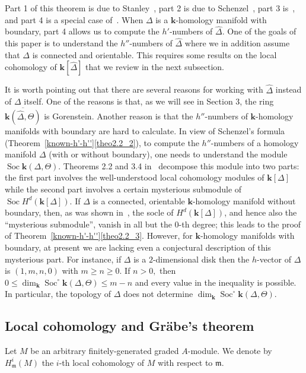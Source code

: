 \documentclass[ALCO,ThmDefs,Unicode,epreuves]{cedram}
\DeclareMathOperator{\Soc}{Soc}
\newcommand{\complet}[1]{\hat{#1}}
\newcommand{\field}{\mathbf{k}}
\newcommand{\mideal}{\ensuremath{\mathfrak{m}}}
\begin{document}
\noindent Part 1 of this theorem is due to Stanley~\cite{Stanley-75}, part 2 is due to Schenzel~\cite{Schenzel-81}, part 3 is~\cite[Theorem~1.3]{Novik-Swartz-09:Gorenstein}, and part 4 is a special case of~\cite[Theorem~4.7]{Novik-Swartz-12}. When $\Delta$ is a $\field$-homology manifold with boundary, part 4 allows us to compute the $h'$-numbers of $\complet{\Delta}$. One of the goals of this paper is to understand the $h''$-numbers of $\complet{\Delta}$ where we in addition assume that $\Delta$ is connected and orientable. This requires some results on the local cohomology of $\field[\complet{\Delta}]$ that we review in the next subsection.


 It is worth pointing out that there are several reasons for working with $\complet{\Delta}$ instead of $\Delta$ itself. One of the reasons is that, as we will see in Section 3, the ring $\overline{\field(\complet{\Delta},\Theta)}$ is Gorenstein. Another reason is that the $h''$-numbers of $\field$-homology manifolds with boundary are hard to calculate. In view of Schenzel's formula (Theorem~\ref{known-h'-h''}\eqref{theo2.2_2}), to compute the $h''$-numbers of a homology manifold $\Delta$ (with or without boundary), one needs to understand the module $\Soc \field(\Delta,\Theta)$. Theorems 2.2 and 3.4 in~\cite{Novik-Swartz-09:Socles} decompose this module into two parts: the first part involves the well-understood local cohomology modules of $\field[\Delta]$ while the second part involves a certain mysterious submodule of $\Soc H^d(\field[\Delta])$. If $\Delta$ is a connected, orientable $\field$-homology manifold without boundary, then, as was shown in~\cite[Theorem~2.1]{Novik-Swartz-09:Gorenstein}, the socle of $H^d(\field[\Delta])$, and hence also the ``mysterious submodule'', vanish in all but the $0$-th degree; this leads to the proof of Theorem~\ref{known-h'-h''}\eqref{theo2.2_3}. However, for $\field$-homology manifolds with boundary, at present we are lacking even a conjectural description of this mysterious part. For instance, if $\Delta$ is a $2$-dimensional disk then the $h$-vector of $\Delta$ is $(1,m,n,0)$ with $m \ge n \ge 0.$ If $n >0,$ then $0 \le \dim_\field \Soc^\circ \field(\Delta,\Theta) \le m-n$ and every value in the inequality is possible. In particular, the topology of $\Delta$ does not determine $\dim_\field \Soc^\circ \field (\Delta, \Theta).$


\subsection{Local cohomology and Gr{\"a}be's theorem}
Let $M$ be an arbitrary finitely-generated graded $A$-module. We denote by $H^i_\mideal(M)$ the $i$-th local cohomology of $M$ with respect to $\mideal$. 
\end{document}
